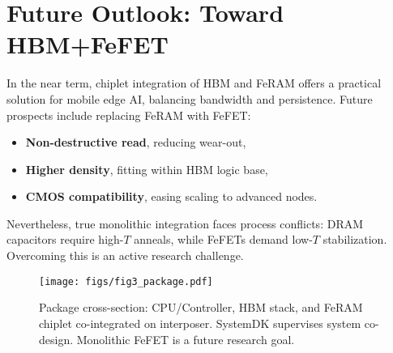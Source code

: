 \section{Future Outlook: Toward HBM+FeFET}
In the near term, chiplet integration of HBM and FeRAM offers a practical solution for mobile edge AI, balancing bandwidth and persistence. 
Future prospects include replacing FeRAM with FeFET:
\begin{itemize}
  \item \textbf{Non-destructive read}, reducing wear-out,
  \item \textbf{Higher density}, fitting within HBM logic base,
  \item \textbf{CMOS compatibility}, easing scaling to advanced nodes.
\end{itemize}

Nevertheless, true monolithic integration faces process conflicts: DRAM capacitors require high-$T$ anneals, while FeFETs demand low-$T$ stabilization. 
Overcoming this is an active research challenge.

\begin{figure}[!t]
\centering
\texttt{[image: figs/fig3\_package.pdf]}
\caption{Package cross-section: CPU/Controller, HBM stack, and FeRAM chiplet co-integrated on interposer. SystemDK supervises system co-design. Monolithic FeFET is a future research goal.}
\label{fig:package_cross}
\end{figure}
